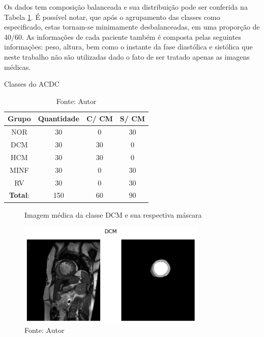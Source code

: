 Os dados tem composição balanceada e sua distribuição pode ser conferida na Tabela \ref{tab:count_dataset}. É possível notar, que após o agrupamento das classes como especificado, estas tornam-se minimamente desbalanceadas, em uma proporção de $40/60$. As informações de cada paciente também é composta pelas seguintes informações: peso, altura, bem como o instante da fase diastólica e sistólica \cite{bernardDeepLearningTechniques2018a} que neste trabalho não são utilizadas dado o fato de ser tratado apenas as imagens médicas.

\begin{table}[H]
    \centering
    \caption{Classes do ACDC}
    \renewcommand{\arraystretch}{1} %
    \begin{tabular}{|c|c|c|c|}
    \hline 
          \textbf{Grupo} & \textbf{Quantidade} & \textbf{C/ CM} & \textbf{S/ CM}  \\ 
    \hline 
        NOR & 30 & 0 & 30 \\ 
        DCM & 30 & 30 & 0\\ 
        HCM & 30 & 30 & 0\\ 
        MINF & 30 & 0 & 30 \\ 
        RV & 30 & 0 & 30 \\
    \hline 
        \textbf{Total}: & 150  & 60 & 90\\ 
    \hline 
    \end{tabular} 
    \caption*{Fonte: Autor}
    \label{tab:count_dataset}
\end{table}


\begin{figure}[H]
    \centering
    \captionsetup{width=0.98\textwidth, justification=justified}
    \caption{Imagem médica da classe DCM e sua respectiva máscara}
    \includegraphics[width=0.8\textwidth]{figures/fig033-01.png}
    \caption*{Fonte: Autor}
    \label{fig:fig033-01}
\end{figure}

